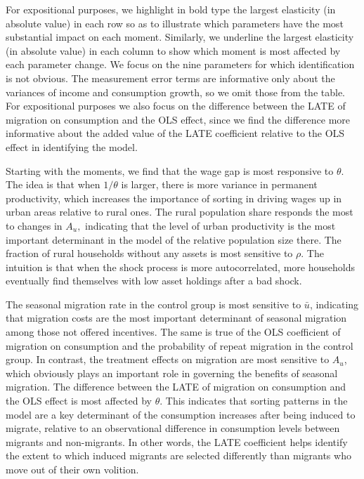 \documentclass[12pt,pdftex]{article}
\begin{document}
For expositional purposes, we highlight in bold type the largest elasticity (in absolute value) in each row so as to illustrate which parameters have the most substantial impact on each moment. Similarly, we underline the largest elasticity (in absolute value) in each column to show which moment is most affected by each parameter change. We focus on the nine parameters for which identification is not obvious. The measurement error terms are informative only about the variances of income and consumption growth, so we omit those from the table. For expositional purposes we also focus on the difference between the LATE of migration on consumption and the OLS effect, since we find the difference more informative about the added value of the LATE coefficient relative to the OLS effect in identifying the model.

Starting with the moments, we find that the wage gap is most responsive to $\theta$. The idea is that when $1/\theta$ is larger, there is more variance in permanent productivity, which increases the importance of sorting in driving wages up in urban areas relative to rural ones. The rural population share responds the most to changes in $A_u,$ indicating that the level of urban productivity is the most important determinant in the model of the relative population size there. The fraction of rural households without any assets is most sensitive to $\rho.$ The intuition is that when the shock process is more autocorrelated, more households eventually find themselves with low asset holdings after a bad shock.

The seasonal migration rate in the control group is most sensitive to $\bar u$, indicating that migration costs are the most important determinant of seasonal migration among those not offered incentives. The same is true of the OLS coefficient of migration on consumption and the probability of repeat migration in the control group. In contrast, the treatment effects on migration are most sensitive to $A_u$, which obviously plays an important role in governing the benefits of seasonal migration. The difference between the LATE of migration on consumption and the OLS effect is most affected by $\theta.$ This indicates that sorting patterns in the model are a key determinant of the consumption increases after being induced to migrate, relative to an observational difference in consumption levels between migrants and non-migrants. In other words, the LATE coefficient helps identify the extent to which induced migrants are selected differently than migrants who move out of their own volition.
\end{document}
